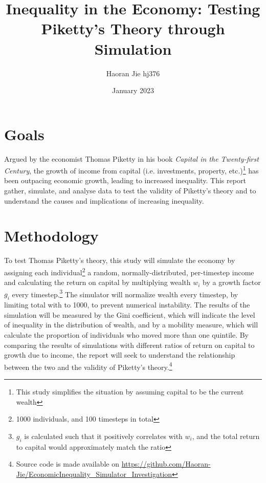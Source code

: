 \documentclass{article}
\title{Inequality in the Economy: Testing Piketty's Theory through Simulation
}
\author{Haoran Jie hj376}
\date{January 2023}
\begin{document}
\maketitle


\section*{Goals}
Argued by the economist Thomas Piketty in his book \textit{Capital in the Twenty-first Century}, the growth of income from capital (i.e. investments, property, etc.)\footnote{This study simplifies the situation by assuming capital to be the current wealth} has been outpacing economic growth, leading to increased inequality. This report gather, simulate, and analyse data to test the validity of Piketty's theory and to understand the causes and implications of increasing inequality.
\vspace{-0.4cm}
\section*{Methodology}
\vspace{-0.3cm}
To test Thomas Piketty's theory, this study will simulate the economy by 
assigning each individual\footnote{1000 individuals, and 100 timesteps in total} a random, normally-distributed, per-timestep income and calculating the return on capital by multiplying wealth $w_i$ by a growth 
factor $g_i$ every timestep.\footnote{$g_i$ is calculated such that it positively correlates with $w_i$, and the total return to capital would approximately match the ratio} The simulator will normalize wealth every timestep, by limiting total with to 1000, to prevent numerical instability. The results of the 
simulation will be measured by the Gini coefficient, which will indicate the level of inequality in the distribution of wealth,
 and by a mobility measure, which will calculate the proportion of individuals who moved more than one quintile. By comparing 
 the results of simulations with different ratios of return on capital to growth due to income, the report will seek to 
 understand the relationship between the two and the validity of Piketty's theory.\footnote{Source code is made available on  \url{https://github.com/Haoran-Jie/EconomicInequality_Simulator_Investigation}}


\vspace{-0.4cm}



\end{document}
